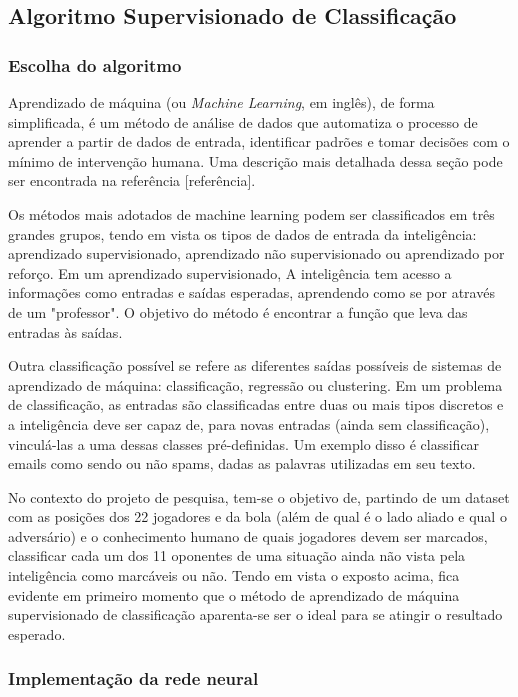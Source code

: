 \documentclass[a4paper,12pt]{article}
\begin{document}
\subsection{Algoritmo Supervisionado de Classificação}

\subsubsection{Escolha do algoritmo}

Aprendizado de máquina (ou \textit{Machine Learning}, em inglês), de forma simplificada, é um método de análise de dados que automatiza o processo de aprender a partir de dados de entrada, identificar padrões e tomar decisões com o mínimo de intervenção humana. Uma descrição mais detalhada dessa seção pode ser encontrada na referência [referência].

Os métodos mais adotados de machine learning podem ser classificados em três grandes grupos, tendo em vista os tipos de dados de entrada da inteligência: aprendizado supervisionado, aprendizado não supervisionado ou  aprendizado por reforço. Em um aprendizado supervisionado, A inteligência tem acesso a informações como
entradas e saídas esperadas, aprendendo como se por através de um "professor". O objetivo do método é encontrar a função que leva das entradas às saídas.

Outra classificação possível se refere as diferentes saídas possíveis de sistemas de aprendizado de máquina: classificação, regressão ou clustering. Em um problema de classificação, as entradas são classificadas entre duas ou mais tipos discretos e a inteligência deve ser capaz de, para novas entradas (ainda sem classificação), vinculá-las a uma dessas classes pré-definidas. Um exemplo disso é classificar emails como sendo ou não spams, dadas as palavras utilizadas em seu texto.

No contexto do projeto de pesquisa, tem-se o objetivo de, partindo de um dataset com as posições dos 22 jogadores e da bola (além de qual é o lado aliado e qual o adversário) e o conhecimento humano de quais jogadores devem ser marcados, classificar cada um dos 11 oponentes de uma situação ainda não vista pela inteligência como marcáveis ou não. Tendo em vista o exposto acima, fica evidente em primeiro momento que o método de aprendizado de máquina supervisionado de classificação aparenta-se ser o ideal para se atingir o resultado esperado.

\subsubsection{Implementação da rede neural}
\end{document}
